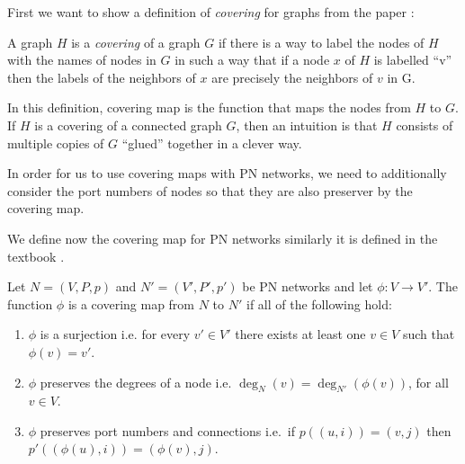 First we want to show a definition of \emph{covering} for graphs from the paper
\cite{DBLP:conf/stoc/Angluin80}:
\begin{displayquote}
A graph $H$ is a \emph{covering} of a graph $G$ if there is a way to label the nodes of $H$ with the names of nodes in $G$ in such a way that if a node $x$ of $H$ is labelled ``v'' then the labels of the neighbors of $x$ are precisely the neighbors of $v$ in G.
\end{displayquote}
In this definition, covering map is the function that maps the nodes from $H$ to $G$.
If $H$ is a covering of a connected graph $G$, then an intuition is that $H$ consists of multiple copies of $G$ ``glued'' together in a clever way.


In order for us to use covering maps with PN networks, we need to additionally consider the port numbers of nodes so that they are also preserver by the covering map.

We define now the covering map for PN networks similarly it is defined in the textbook \cite{HirvonenSuomelaDistAlg2020}.

\begin{definition} \label{def:covering_map}
  Let $N=(V, P, p)$ and $N'=(V', P', p')$ be PN networks and let $\phi\colon V \rightarrow V'$.
  The function $\phi$ is a covering map from $N$ to $N'$ if all of the following hold:
  \begin{enumerate}
    \item $\phi$ is a surjection i.e. for every $v' \in V'$ there exists at least one $v \in V$ such that $\phi(v) = v'$.
    \item $\phi$ preserves the degrees of a node i.e. $\deg_N(v) = \deg_{N'}(\phi(v))$, for all $v \in V$.
    \item $\phi$ preserves port numbers and connections i.e.\ if $p((u, i)) = (v, j)$ then $p'((\phi(u), i)) = (\phi(v), j)$.
  \end{enumerate}
\end{definition}

